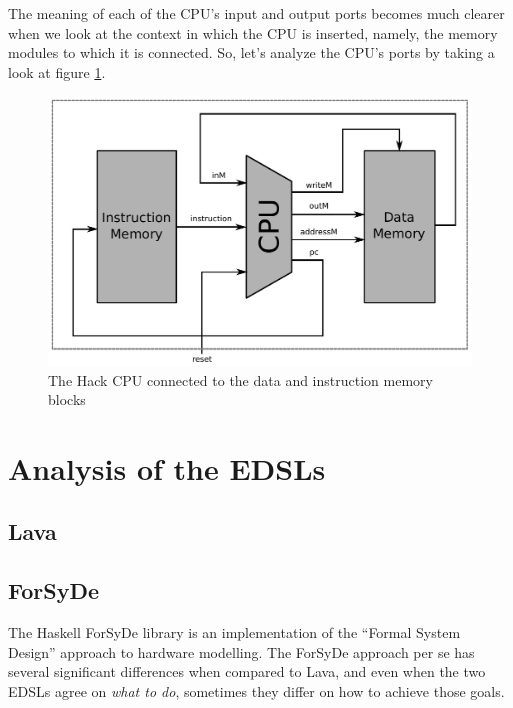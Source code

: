 \documentclass[a4paper]{article}
\begin{document}
            The meaning of each of the CPU's input and output ports becomes much clearer when we
            look at the context in which the CPU is inserted, namely, the memory modules to which it
            is connected. So, let's analyze the CPU's ports by taking a look at figure
            \ref{fig:cpu-memory}.
            \begin{figure}[h]
                \begin{center}
                    \includegraphics[width=1.0\textwidth]{imgs/cpu-memory.pdf}
                \end{center}
                \label{fig:cpu-memory}
                \caption{The Hack CPU connected to the data and instruction memory blocks}
            \end{figure}

    \section{Analysis of the EDSLs}
    \label{sec:edsls}

        \subsection{Lava}
        \label{subsec:lava}

        \subsection{ForSyDe}
        \label{subsec:forsyde}
            The Haskell ForSyDe library is an implementation of the ``Formal System Design''
            approach to hardware modelling\cite{forsyde1999}. The ForSyDe approach per se has
            several significant differences when compared to Lava, and even when the two EDSLs agree
            on \emph{what to do}, sometimes they differ on how to achieve those goals.
\end{document}
